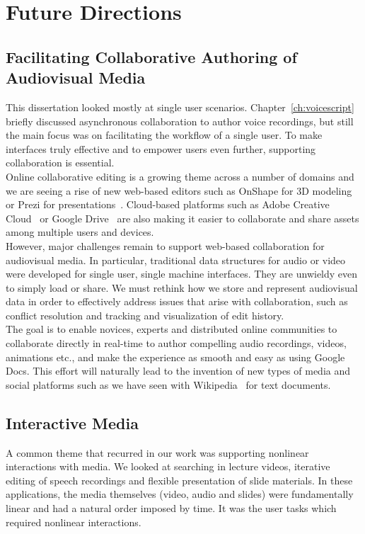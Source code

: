 \section{Future Directions}
\subsection{Facilitating Collaborative Authoring of Audiovisual Media}
This dissertation looked mostly at single user scenarios. Chapter~\ref{ch:voicescript} briefly discussed asynchronous collaboration to author voice recordings, but still the main focus was on facilitating the workflow of a single user. To make interfaces truly effective and to
empower users even further, supporting collaboration is essential.\\

Online collaborative editing is a growing theme across a number of domains and we are seeing a rise of new web-based editors such as OnShape for 3D modeling~\cite{onshape2017} or Prezi for presentations~\cite{prezi2017}. Cloud-based platforms such as Adobe Creative Cloud~\cite{creativecloud2017} or Google Drive~\cite{googledrive2017} are also making it easier to collaborate and share assets among multiple users and devices.\\

However, major challenges remain to support web-based collaboration for audiovisual media. In particular, traditional data structures for audio or video were developed for single user, single machine interfaces. They are unwieldy even to simply load or share. We must rethink how we store and represent audiovisual data in order to effectively address issues that arise with collaboration, such as conflict resolution and tracking and visualization of edit history.\\

The goal is to enable novices, experts and distributed online communities to collaborate directly in real-time to author compelling audio recordings, videos, animations etc., and make the experience as smooth and easy as using Google Docs. This effort will naturally lead to the invention of new types of media and social platforms such as we have seen with Wikipedia~\cite{wiki2017} for text documents.

\subsection{Interactive Media}
A common theme that recurred in our work was supporting nonlinear interactions with media. We looked at searching in lecture videos, iterative editing of speech recordings and flexible presentation of slide materials. In these applications, the media themselves (video, audio and slides) were fundamentally linear and had a natural order imposed by time. It was the user tasks which required nonlinear interactions.\\

